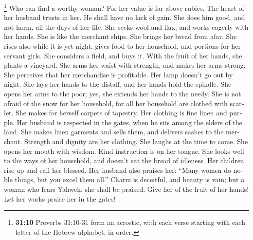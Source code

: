 \begin{paracol}{2}
\begin{otherlanguage}{english}
 \footnote{\textbf{31:10} Proverbs 31:10-31 form an
  acrostic, with each verse starting with each letter of the Hebrew
  alphabet, in order.} Who can find a worthy woman? For her value is far
above rubies.  The heart of her husband trusts in her. He
shall have no lack of gain.  She does him good, and not
harm, all the days of her life.  She seeks wool and flax,
and works eagerly with her hands.  She is like the
merchant ships. She brings her bread from afar.  She
rises also while it is yet night, gives food to her household, and
portions for her servant girls.  She considers a field,
and buys it. With the fruit of her hands, she plants a vineyard.
 She arms her waist with strength, and makes her arms
strong.  She perceives that her merchandise is
profitable. Her lamp doesn't go out by night.  She lays
her hands to the distaff, and her hands hold the spindle.
 She opens her arms to the poor; yes, she extends her
hands to the needy.  She is not afraid of the snow for
her household, for all her household are clothed with scarlet.
 She makes for herself carpets of tapestry. Her clothing
is fine linen and purple.  Her husband is respected in
the gates, when he sits among the elders of the land. 
She makes linen garments and sells them, and delivers sashes to the
merchant.  Strength and dignity are her clothing. She
laughs at the time to come.  She opens her mouth with
wisdom. Kind instruction is on her tongue.  She looks
well to the ways of her household, and doesn't eat the bread of
idleness.  Her children rise up and call her blessed. Her
husband also praises her:  ``Many women do noble things,
but you excel them all.''  Charm is deceitful, and beauty
is vain; but a woman who fears Yahweh, she shall be praised.
 Give her of the fruit of her hands! Let her works praise
her in the gates! \end{otherlanguage}
\end{paracol}
